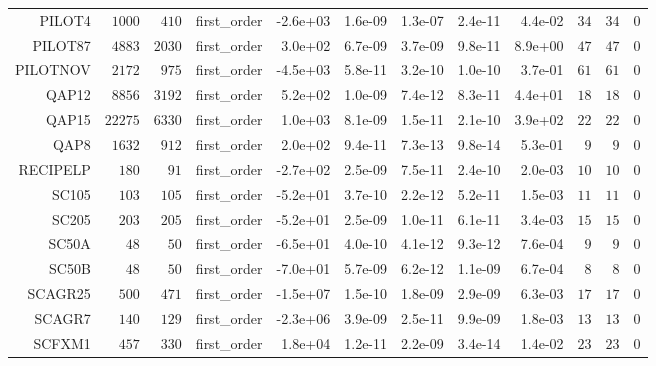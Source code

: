 \begin{longtable}{rrrrrrrrrrrr}
  PILOT4 & \(  1000\) & \(   410\) & first\_order & -2.6e+03 &  1.6e-09 &  1.3e-07 &  2.4e-11 &  4.4e-02 & \(    34\) & \(    34\) & \(     0\) \\
  PILOT87 & \(  4883\) & \(  2030\) & first\_order &  3.0e+02 &  6.7e-09 &  3.7e-09 &  9.8e-11 &  8.9e+00 & \(    47\) & \(    47\) & \(     0\) \\
  PILOTNOV & \(  2172\) & \(   975\) & first\_order & -4.5e+03 &  5.8e-11 &  3.2e-10 &  1.0e-10 &  3.7e-01 & \(    61\) & \(    61\) & \(     0\) \\
  QAP12 & \(  8856\) & \(  3192\) & first\_order &  5.2e+02 &  1.0e-09 &  7.4e-12 &  8.3e-11 &  4.4e+01 & \(    18\) & \(    18\) & \(     0\) \\
  QAP15 & \( 22275\) & \(  6330\) & first\_order &  1.0e+03 &  8.1e-09 &  1.5e-11 &  2.1e-10 &  3.9e+02 & \(    22\) & \(    22\) & \(     0\) \\
  QAP8 & \(  1632\) & \(   912\) & first\_order &  2.0e+02 &  9.4e-11 &  7.3e-13 &  9.8e-14 &  5.3e-01 & \(     9\) & \(     9\) & \(     0\) \\
  RECIPELP & \(   180\) & \(    91\) & first\_order & -2.7e+02 &  2.5e-09 &  7.5e-11 &  2.4e-10 &  2.0e-03 & \(    10\) & \(    10\) & \(     0\) \\
  SC105 & \(   103\) & \(   105\) & first\_order & -5.2e+01 &  3.7e-10 &  2.2e-12 &  5.2e-11 &  1.5e-03 & \(    11\) & \(    11\) & \(     0\) \\
  SC205 & \(   203\) & \(   205\) & first\_order & -5.2e+01 &  2.5e-09 &  1.0e-11 &  6.1e-11 &  3.4e-03 & \(    15\) & \(    15\) & \(     0\) \\
  SC50A & \(    48\) & \(    50\) & first\_order & -6.5e+01 &  4.0e-10 &  4.1e-12 &  9.3e-12 &  7.6e-04 & \(     9\) & \(     9\) & \(     0\) \\
  SC50B & \(    48\) & \(    50\) & first\_order & -7.0e+01 &  5.7e-09 &  6.2e-12 &  1.1e-09 &  6.7e-04 & \(     8\) & \(     8\) & \(     0\) \\
  SCAGR25 & \(   500\) & \(   471\) & first\_order & -1.5e+07 &  1.5e-10 &  1.8e-09 &  2.9e-09 &  6.3e-03 & \(    17\) & \(    17\) & \(     0\) \\
  SCAGR7 & \(   140\) & \(   129\) & first\_order & -2.3e+06 &  3.9e-09 &  2.5e-11 &  9.9e-09 &  1.8e-03 & \(    13\) & \(    13\) & \(     0\) \\
  SCFXM1 & \(   457\) & \(   330\) & first\_order &  1.8e+04 &  1.2e-11 &  2.2e-09 &  3.4e-14 &  1.4e-02 & \(    23\) & \(    23\) & \(     0\) \\

\end{longtable}
